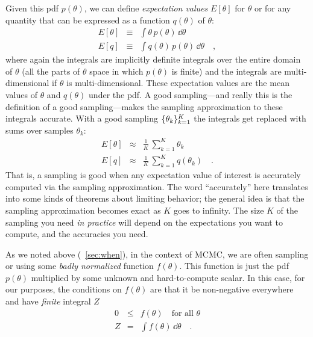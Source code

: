 \documentclass[12pt,twoside,pdftex]{article}
\newcommand{\pars}{\theta}
\begin{document}
Given this pdf $p(\pars)$, we can define \emph{expectation values} $E[\pars]$
for $\pars$ or for any quantity that can be expressed as a function $q(\pars)$
of $\pars$:
\begin{eqnarray}
E[\pars] &\equiv& \int \pars\,p(\pars)\,\dd \pars
\\
E[q] &\equiv& \int q(\pars)\,p(\pars)\,\dd \pars
\quad ,
\end{eqnarray}
where again the integrals are implicitly definite integrals over the
entire domain
of $\pars$ (all the parts of $\pars$ space in which $p(\pars)$ is finite) and the
integrals are multi-dimensional if $\pars$ is multi-dimensional.
These expectation values are the mean values of $\pars$ and $q(\pars)$ under
the pdf.  A good sampling---and really this is the definition of a good
sampling---makes the sampling approximation to these integrals
accurate.
With a good sampling $\setof{\pars_k}_{k=1}^K$ the integrals get replaced
with sums over samples $\pars_k$:
\begin{eqnarray}
E[\pars] &\approx& \frac{1}{K}\,\sum_{k=1}^K \pars_k
\\
E[q] &\approx& \frac{1}{K}\,\sum_{k=1}^K q(\pars_k)
\quad .
\end{eqnarray}
That is, a sampling is good when any expectation value of interest is
accurately computed via the sampling approximation.
The word ``accurately'' here translates into some kinds of theorems
about limiting behavior; the general idea is that the sampling
approximation becomes exact as $K$ goes to infinity.
The size $K$ of the sampling you need \emph{in practice} will depend
on the expectations you want to compute, and the accuracies you need.

As we noted above (\sectionname~\ref{sec:when}), in the context of MCMC, we are often sampling or
using some \emph{badly normalized} function $f(\pars)$.
This function is just the pdf $p(\pars)$ multiplied by some unknown and
hard-to-compute scalar.
In this case, for our purposes, the conditions on $f(\pars)$ are that it
be non-negative everywhere and have \emph{finite} integral $Z$
\begin{eqnarray}
0 &\leq& f(\pars) \quad \mbox{for all $\pars$}
\\
Z &=& \int f(\pars)\,\dd \pars
\quad .
\end{eqnarray}
\end{document}
